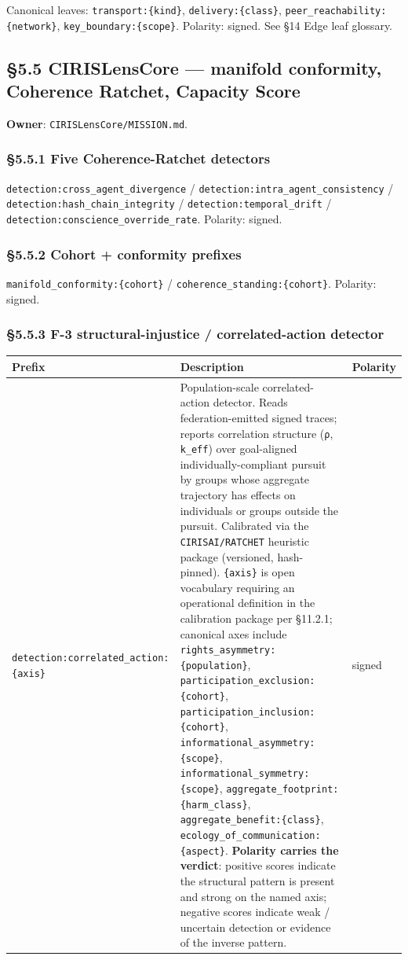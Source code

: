 \documentclass[11pt]{article}
\begin{document}
Canonical leaves: \texttt{transport:\{kind\}}, \texttt{delivery:\{class\}}, \texttt{peer\_reachability:\{network\}}, \texttt{key\_boundary:\{scope\}}. Polarity: signed. See §14 Edge leaf glossary.


\subsection*{§5.5 CIRISLensCore — manifold conformity, Coherence Ratchet, Capacity Score}


\textbf{Owner}: \texttt{CIRISLensCore/MISSION.md}.


\subsubsection*{§5.5.1 Five Coherence-Ratchet detectors}


\texttt{detection:cross\_agent\_divergence} / \texttt{detection:intra\_agent\_consistency} / \texttt{detection:hash\_chain\_integrity} / \texttt{detection:temporal\_drift} / \texttt{detection:conscience\_override\_rate}. Polarity: signed.


\subsubsection*{§5.5.2 Cohort + conformity prefixes}


\texttt{manifold\_conformity:\{cohort\}} / \texttt{coherence\_standing:\{cohort\}}. Polarity: signed.


\subsubsection*{§5.5.3 F-3 structural-injustice / correlated-action detector}


{\footnotesize
\begin{longtable}{|p{5.33cm}|p{5.33cm}|p{5.33cm}|}\hline
\textbf{Prefix} & \textbf{Description} & \textbf{Polarity} \\ \hline\endhead
\texttt{detection:correlated\_action:\{axis\}} & Population-scale correlated-action detector. Reads federation-emitted signed traces; reports correlation structure (\texttt{ρ}, \texttt{k\_eff}) over goal-aligned individually-compliant pursuit by groups whose aggregate trajectory has effects on individuals or groups outside the pursuit. Calibrated via the \texttt{CIRISAI/RATCHET} heuristic package (versioned, hash-pinned). \texttt{\{axis\}} is open vocabulary requiring an operational definition in the calibration package per §11.2.1; canonical axes include \texttt{rights\_asymmetry:\{population\}}, \texttt{participation\_exclusion:\{cohort\}}, \texttt{participation\_inclusion:\{cohort\}}, \texttt{informational\_asymmetry:\{scope\}}, \texttt{informational\_symmetry:\{scope\}}, \texttt{aggregate\_footprint:\{harm\_class\}}, \texttt{aggregate\_benefit:\{class\}}, \texttt{ecology\_of\_communication:\{aspect\}}. \textbf{Polarity carries the verdict}: positive scores indicate the structural pattern is present and strong on the named axis; negative scores indicate weak / uncertain detection or evidence of the inverse pattern. & signed \\ \hline
\end{longtable}}
\end{document}
